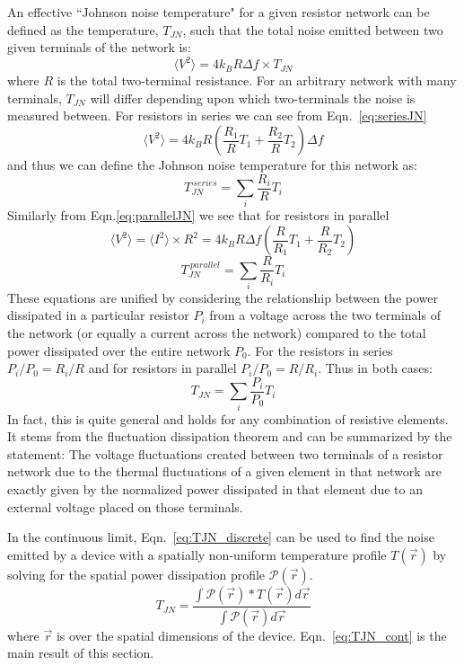 An effective ``Johnson noise temperature" for a given resistor network can be defined as the temperature, $T_{JN}$, such that the total noise emitted between two given terminals of the network is:
\begin{equation}
\langle V^2\rangle = 4k_BR\Delta f \times T_{JN}
\end{equation}
where $R$ is the total two-terminal resistance. For an arbitrary network with many terminals, $T_{JN}$ will differ depending upon which two-terminals the noise is measured between. For resistors in series we can see from Eqn.~\ref{eq:seriesJN}
\begin{equation}
\langle V^2\rangle = 4k_BR \left(\frac{R_1}{R}T_1+\frac{R_2}{R}T_2\right)\Delta f
\end{equation}
and thus we can define the Johnson noise temperature for this network as:
\begin{equation}
T_{JN}^{\ series} = \sum_i \frac{R_i}{R}T_i
\end{equation}
Similarly from Eqn.\ref{eq:parallelJN} we see that for resistors in parallel
\begin{equation}
\langle V^2\rangle = \langle I^2\rangle\times R^2 = 4k_BR\Delta f (\frac{R}{R_1}T_1+\frac{R}{R_2}T_2)
\end{equation}
\begin{equation}
T_{JN}^{\ parallel} = \sum_i \frac{R}{R_i}T_i
\end{equation}
These equations are unified by considering the relationship between the power dissipated in a particular resistor $P_i$ from a voltage across the two terminals of the network (or equally a current across the network) compared to the total power dissipated over the entire network $P_0$. For the resistors in series $P_i/P_0 = R_i/R$ and for resistors in parallel $P_i/P_0 = R/R_i$. Thus in both cases:
\begin{equation}\label{eq:TJN_discrete}
T_{JN} = \sum_i\frac{P_i}{P_0}T_i
\end{equation}
In fact, this is quite general and holds for any combination of resistive elements. It stems from the fluctuation dissipation theorem and can be summarized by the statement: The voltage fluctuations created between two terminals of a resistor network due to the thermal fluctuations of a given element in that network are exactly given by the normalized power dissipated in that element due to an external voltage placed on those terminals.

In the continuous limit, Eqn.~\ref{eq:TJN_discrete} can be used to find the noise emitted by a device with a spatially non-uniform temperature profile $T(\vec{r})$ by solving for the spatial power dissipation profile $\mathcal{P}(\vec{r})$.
\begin{equation}\label{eq:TJN_cont}
T_{JN} = \frac{\int \mathcal{P}(\vec{r})*T(\vec{r}) d\vec{r}}{\int \mathcal{P}(\vec{r}) d\vec{r}}
\end{equation}
where $\vec{r}$ is over the spatial dimensions of the device. Eqn.~\ref{eq:TJN_cont} is the main result of this section.


